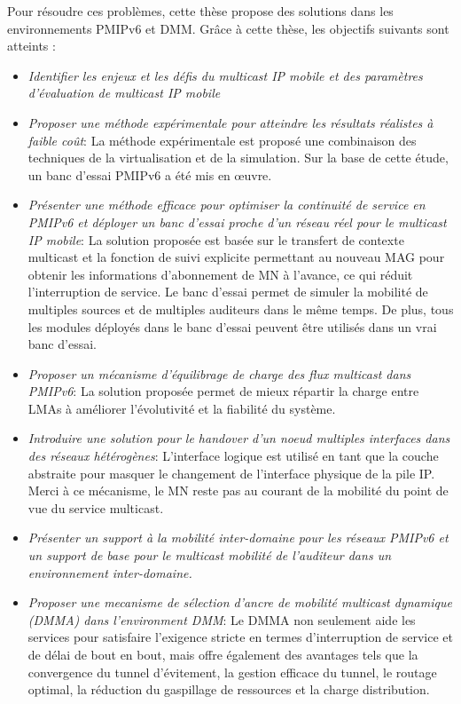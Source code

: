 Pour résoudre ces problèmes, cette thèse propose des solutions dans les environnements PMIPv6 et DMM. Grâce à cette thèse, les objectifs suivants sont atteints :
\begin{itemize}
\item \textit{Identifier les enjeux et les défis du multicast IP mobile et des paramètres d'évaluation de multicast IP mobile}

\item \textit{Proposer une méthode expérimentale pour atteindre les résultats réalistes à faible coût}: La méthode expérimentale est proposé une combinaison des techniques de la virtualisation et de la simulation. Sur la base de cette étude, un banc d'essai PMIPv6 a été mis en œuvre.

\item \textit{Présenter une méthode efficace pour optimiser la continuité de service en PMIPv6 et déployer un banc d'essai proche d’un réseau réel pour le multicast IP mobile}: La solution proposée est basée sur le transfert de contexte multicast et la fonction de suivi explicite permettant au nouveau MAG pour obtenir les informations d'abonnement de MN à l'avance, ce qui réduit l'interruption de service. Le banc d'essai permet de simuler la mobilité de multiples sources et de multiples auditeurs dans le même temps. De plus, tous les modules déployés dans le banc d'essai peuvent être utilisés dans un vrai banc d'essai.


\item \textit{Proposer un mécanisme d'équilibrage de charge des flux multicast dans PMIPv6}: La solution proposée permet de mieux répartir la charge entre LMAs à améliorer l'évolutivité et la fiabilité du système.
\item \textit{Introduire une solution pour le handover d'un noeud multiples interfaces dans des réseaux hétérogènes}: L'interface logique est utilisé en tant que la couche abstraite pour masquer le changement de l'interface physique de la pile IP. Merci à ce mécanisme, le MN reste pas au courant de la mobilité du point de vue du service multicast. 
\item \textit{Présenter un support à la mobilité inter-domaine pour les réseaux PMIPv6 et un support de base pour le multicast mobilité de l'auditeur dans un environnement inter-domaine.}

\item \textit{Proposer une mecanisme de sélection d'ancre de mobilité multicast dynamique (DMMA) dans l'environment DMM}: Le DMMA non seulement aide les services pour satisfaire l'exigence stricte en termes d'interruption de service et de délai de bout en bout, mais offre également des avantages tels que la convergence du tunnel d'évitement, la gestion efficace du tunnel, le routage optimal, la réduction du gaspillage de ressources et la charge distribution.

\end{itemize}

